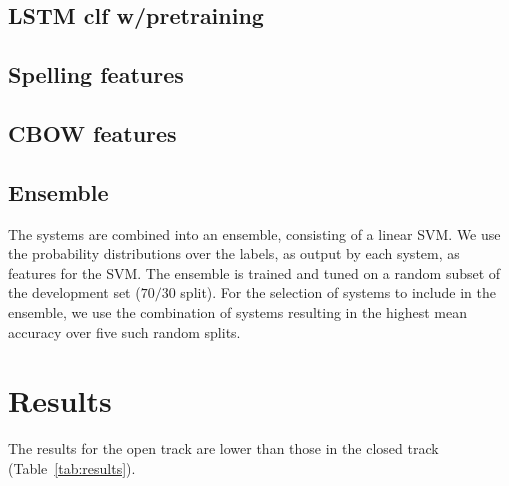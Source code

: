 \documentclass[11pt,letterpaper]{article}
\begin{document}
\subsection{LSTM clf w/pretraining}


\subsection{Spelling features}

\subsection{CBOW features}

\subsection{Ensemble}
The systems are combined into an ensemble, consisting of a linear SVM.
We use the probability distributions over the labels, as output by each system, as features for the SVM.
The ensemble is trained and tuned on a random subset of the development set ($70/30$ split).
For the selection of systems to include in the ensemble, we use the combination of systems resulting in the highest mean accuracy over five such random splits.

\section{Results}
The results for the open track are lower than those in the closed track (Table~\ref{tab:results}).
\end{document}
